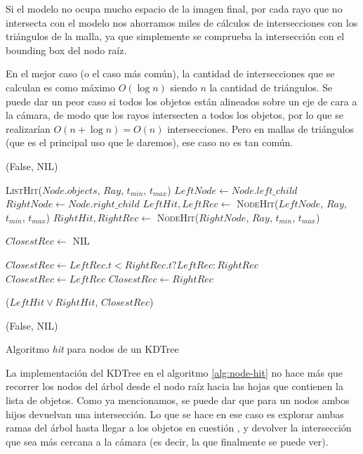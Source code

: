 Si el modelo no ocupa mucho espacio de la imagen final, por cada rayo que no
intersecta con el modelo nos ahorramos miles de cálculos de intersecciones con
los triángulos de la malla, ya que simplemente se comprueba la intersección con
el bounding box del nodo raíz.

En el mejor caso (o el caso más común), la cantidad de intersecciones que se
calculan es como máximo $O(\log n)$ siendo $n$ la cantidad de triángulos. Se
puede dar un peor caso si todos los objetos están alineados sobre un eje de cara
a la cámara, de modo que los rayos intersecten a todos los objetos, por lo que
se realizarían $O(n+\log n)=O(n)$ intersecciones. Pero en mallas de triángulos
(que es el principal uso que le daremos), ese caso no es tan común.

\begin{algorithm}[H]
\begin{algorithmic}[1]
        \State \Return (False, NIL)
    \EndIf

    \State \Return \textsc{ListHit}($Node.objects$, $Ray$, $t_{min}$, $t_{max}$)
    \Else
        \State $LeftNode \gets Node.left\_child$ 
        \State $RightNode \gets Node.right\_child$ 
        \State $LeftHit, LeftRec \gets$ \textsc{NodeHit}($LeftNode$, $Ray$,
        $t_{min}$, $t_{max}$)
        \State $RightHit, RightRec \gets$ \textsc{NodeHit}($RightNode$, $Ray$,
        $t_{min}$, $t_{max}$)

        \State $ClosestRec \gets$ NIL

            \State $ClosestRec \gets LeftRec.t < RightRec.t ? LeftRec : RightRec$
            \State $ClosestRec \gets LeftRec$
            \State $ClosestRec \gets RightRec$
        \EndIf

        \State \Return ($LeftHit \lor RightHit$, $ClosestRec$)
    \EndIf


    \State \Return (False, NIL)
\EndFunction
\end{algorithmic}
\caption{Algoritmo \textit{hit} para nodos de un KDTree}
\label{alg:node-hit}
\end{algorithm}

La implementación del KDTree en el algoritmo \ref{alg:node-hit} no hace más que
recorrer los nodos del árbol desde el nodo raíz hacia las hojas que contienen la
lista de objetos. Como ya mencionamos, se puede dar que para un nodos ambos
hijos devuelvan una intersección. Lo que se hace en ese caso es explorar ambas
ramas del árbol hasta llegar a los objetos en cuestión , y devolver la
intersección que sea más cercana a la cámara (es decir, la que finalmente se
puede ver).

